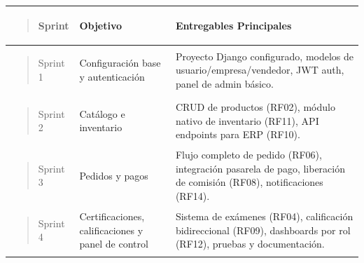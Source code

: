 \documentclass[
]{article}
\newcounter{none} %
\begin{document}
{\def\LTcaptype{none} %
\begin{longtable}[]{@{}
  >{\raggedright\arraybackslash}p{}
  >{\raggedright\arraybackslash}p{}
  >{\raggedright\arraybackslash}p{}@{}}
\toprule\noalign{}
\begin{minipage}[b]{\linewidth}\raggedright
\begin{quote}
Sprint
\end{quote}
\end{minipage} & \begin{minipage}[b]{\linewidth}\raggedright
Objetivo
\end{minipage} & \begin{minipage}[b]{\linewidth}\raggedright
Entregables Principales
\end{minipage} \\
\midrule\noalign{}
\endhead
\bottomrule\noalign{}
\endlastfoot
\begin{minipage}[t]{\linewidth}\raggedright
\begin{quote}
Sprint 1
\end{quote}
\end{minipage} & Configuración base y autenticación & Proyecto Django
configurado, modelos de usuario/empresa/vendedor, JWT auth, panel de
admin básico. \\
\begin{minipage}[t]{\linewidth}\raggedright
\begin{quote}
Sprint 2
\end{quote}
\end{minipage} & Catálogo e inventario & CRUD de productos (RF02),
módulo nativo de inventario (RF11), API endpoints para ERP (RF10). \\
\begin{minipage}[t]{\linewidth}\raggedright
\begin{quote}
Sprint 3
\end{quote}
\end{minipage} & Pedidos y pagos & Flujo completo de pedido (RF06),
integración pasarela de pago, liberación de comisión (RF08),
notificaciones (RF14). \\
\begin{minipage}[t]{\linewidth}\raggedright
\begin{quote}
Sprint 4
\end{quote}
\end{minipage} & Certificaciones, calificaciones y panel de control &
Sistema de exámenes (RF04), calificación bidireccional (RF09),
dashboards por rol (RF12), pruebas y documentación. \\
\end{longtable}
}
\end{document}
